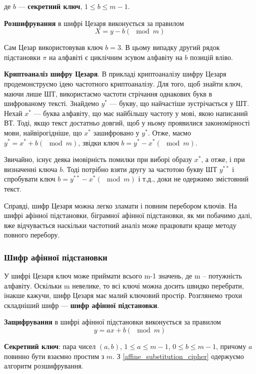 де $b$ --- \textbf{секретний ключ}, $1 \leqslant b \leqslant m-1$.

\textbf{Розшифрування} в шифрі Цезаря виконується за правилом
$$X = y - b (\mod m)$$

Сам Цезар використовував ключ $b=3$. В цьому випадку другий рядок
підстановки $\pi$ на алфавіті є циклічним зсувом алфавіту на
$b$ позицій вліво.

\textbf{Криптоаналіз шифру Цезаря}. В прикладі криптоаналізу шифру Цезаря
продемонструємо ідею частотного криптоаналізу. Для того, щоб знайти
ключ, маючи лише ШТ, використаємо частоти стрічання однакових букв в
шифрованому тексті. Знайдемо $y^{*}$ --- букву, що найчастіше зустрічається у
ШТ. Нехай $x^{*}$ --- буква алфавіту, що має найбільшу частоту у мові, якою
написаний ВТ. Тоді, якщо текст достатньо довгий, щоб у ньому проявилися
закономірності мови, найвірогідніше, що $x^{*}$ зашифровано у $y^{*}$. Отже,
маємо $y^{*} = x^{*} + b (\mod m)$, звідки ключ $b = y^{*} - x^{*} (\mod m)$.

Звичайно, існує деяка імовірність помилки при виборі образу $x^{*}$, а отже,
і при визначенні ключа $b$. Тоді потрібно взяти другу за частотою букву ШТ
$y^{**}$ і спробувати ключ $b = y^{**} - x^{*} (\mod m)$ і т.д., доки не одержимо
змістовний текст.

Справді, шифр Цезаря можна легко зламати і повним перебором ключів.
На шифрі афінної підстановки, біграмної афінної підстановки, як ми
побачимо далі, вже відчувається наскільки частотний аналіз може працювати
краще методу повного перебору.

\subsubsection{Шифр афінної підстановки}

У шифрі Цезаря ключ може приймати всього m-1 значень, де m –
потужність алфавіту. Оскільки m невелике, то всі ключі можна досить
швидко перебрати, інакше кажучи, шифр Цезаря має малий ключовий
простір. Розглянемо трохи складніший шифр --- \textbf{шифр афінної підстановки}.

\textbf{Защифрування} в шифрі афінної підстановки виконується за правилом
\begin{equation}
    \label{affine_substitution_cipher}
    y = ax + b (\mod m)
\end{equation}
 
\textbf{Секретний ключ}: пара чисел $(a, b)$, $1 \leqslant a \leqslant m-1$,
$0 \leqslant b \leqslant m-1$, причому $a$
повинно бути взаємно простим з $m$. З \ref{affine_substitution_cipher}
одержуємо алгоритм розшифрування.

